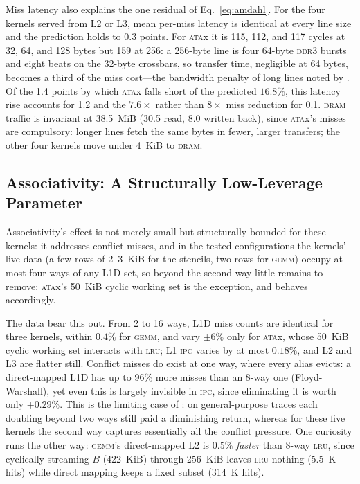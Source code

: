 \documentclass[12pt]{article}
\begin{document}
Miss latency also explains the one residual of Eq.~\ref{eq:amdahl}. For the four
kernels served from L2 or L3, mean per-miss latency is identical at every line
size and the prediction holds to 0.3 points. For \textsc{ata}x it is 115, 112,
and 117 cycles at 32, 64, and 128 bytes but 159 at 256: a 256-byte line is four
64-byte \textsc{ddr3} bursts and eight beats on the 32-byte crossbars, so
transfer time, negligible at 64 bytes, becomes a third of the miss cost---the
bandwidth penalty of long lines noted by \cite{smith:1987}. Of the 1.4 points by
which \textsc{ata}x falls short of the predicted \(16.8\%\), this latency rise
accounts for 1.2 and the \(7.6\times\) rather than \(8\times\) miss reduction for
0.1. \textsc{dram} traffic is invariant at 38.5~MiB (30.5 read, 8.0 written
back), since \textsc{ata}x's misses
are compulsory: longer lines fetch the same bytes in fewer, larger transfers; the
other four kernels move under 4~KiB to \textsc{dram}.

\subsection{Associativity: A Structurally Low-Leverage Parameter}\label{sub:assoc}

Associativity's effect is not merely small but structurally bounded for these
kernels: it addresses conflict misses, and in the tested configurations the
kernels' live data (a few rows of 2--3~KiB for the stencils, two rows for
\textsc{gemm}) occupy at most four ways of any L1D set, so beyond the second way
little remains to remove; \textsc{ata}x's 50~KiB cyclic working set is the
exception, and behaves accordingly.

The data bear this out. From 2 to 16 ways, L1D miss counts are identical for
three kernels, within \(0.4\%\) for \textsc{gemm}, and vary \(\pm 6\%\) only for
\textsc{ata}x, whose 50~KiB cyclic working set interacts with \textsc{lru}; L1
\textsc{ipc} varies by at most \(0.18\%\), and L2 and L3 are flatter still.
Conflict misses do exist at one way, where every alias evicts: a direct-mapped
L1D has up to \(96\%\) more misses than an 8-way one (Floyd-Warshall), yet even
this is largely invisible in \textsc{ipc}, since eliminating it is worth only
\(+0.29\%\). This is the limiting case of \cite{hill:1989}: on general-purpose
traces each doubling beyond two ways still paid a diminishing return, whereas for
these five kernels the second way captures essentially all the conflict pressure.
One curiosity runs the other way: \textsc{gemm}'s direct-mapped L2 is \(0.5\%\)
\textit{faster} than 8-way \textsc{lru}, since cyclically streaming \(B\)
(422~KiB) through 256~KiB leaves \textsc{lru} nothing (5.5~K hits) while direct
mapping keeps a fixed subset (314~K hits).
\end{document}
